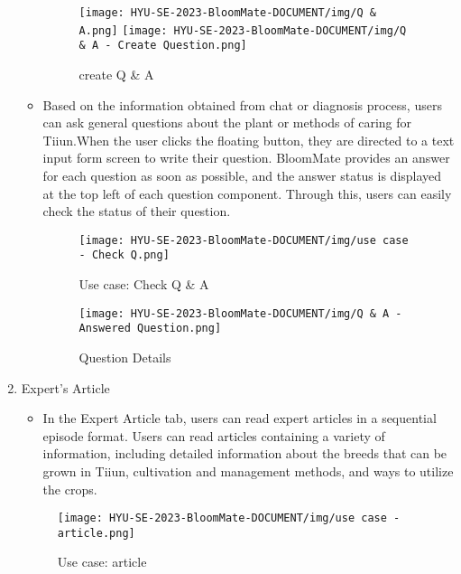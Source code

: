 \documentclass[conference, a4paper]{IEEEtran}
\begin{document}
\begin{enumerate}
\begin{itemize}
        \begin{figure}[h]
        \centerline{
            \texttt{[image: HYU-SE-2023-BloomMate-DOCUMENT/img/Q \& A.png]}
            \texttt{[image: HYU-SE-2023-BloomMate-DOCUMENT/img/Q \& A - Create Question.png]}
        }
        \label{fig}
        \caption{create Q \& A}
        \end{figure}
        
            \newpage
            
            \item Based on the information obtained from chat or diagnosis process, users can ask general questions about the plant or methods of caring for Tiiun.When the user clicks the floating button, they are directed to a text input form screen to write their question. BloomMate provides an answer for each question as soon as possible, and the answer status is displayed at the top left of each question component. Through this, users can easily check the status of their question.
    \begin{figure}[h]
    \centerline{
        \texttt{[image: HYU-SE-2023-BloomMate-DOCUMENT/img/use case - Check Q.png]}
    }
    \label{fig}
    \caption{Use case: Check Q \& A}
    \end{figure}
    
    \begin{figure}[h]
    \centerline{
        \texttt{[image: HYU-SE-2023-BloomMate-DOCUMENT/img/Q \& A - Answered Question.png]}
    }
    \label{fig}
    \caption{Question Details}
    \end{figure}
    
        \end{itemize}
    \item Expert’s Article
        \begin{itemize}
            \item In the Expert Article tab, users can read expert articles in a sequential episode format. Users can read articles containing a variety of information, including detailed information about the breeds that can be grown in Tiiun, cultivation and management methods, and ways to utilize the crops. \\
        \end{itemize}
 \begin{figure}[h]
    \centerline{
        \texttt{[image: HYU-SE-2023-BloomMate-DOCUMENT/img/use case - article.png]}
    }
    \label{fig}
    \caption{Use case: article}
\end{figure}
    

\end{enumerate}
\end{document}
